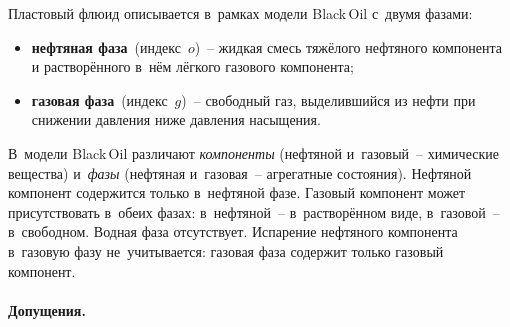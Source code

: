 \documentclass[12pt,a4paper]{article}
\begin{document}
Пластовый флюид описывается в~рамках модели Black\,Oil с~двумя фазами:
\begin{itemize}[nosep]
  \item \textbf{нефтяная фаза}~(индекс~$o$)~-- жидкая смесь тяжёлого
        нефтяного компонента и растворённого в~нём лёгкого газового
        компонента;
  \item \textbf{газовая фаза}~(индекс~$g$)~-- свободный газ, выделившийся
        из нефти при снижении давления ниже давления насыщения.
\end{itemize}

В~модели Black\,Oil различают \emph{компоненты} (нефтяной и~газовый~--
химические вещества) и~\emph{фазы} (нефтяная и~газовая~-- агрегатные
состояния). Нефтяной компонент содержится только в~нефтяной фазе.
Газовый компонент может присутствовать в~обеих фазах: в~нефтяной~--
в~растворённом виде, в~газовой~-- в~свободном. Водная фаза отсутствует.
Испарение нефтяного компонента в~газовую фазу не~учитывается: газовая
фаза содержит только газовый компонент.

\paragraph{Допущения.}
\end{document}
